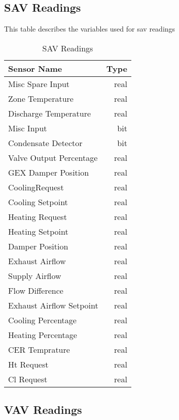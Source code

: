 \pagebreak

\subsection{SAV Readings}

This table describes the variables used for \gls{sav} readings

\begin{table}[!htb]
\centering
\begin{tabular}{| l r |}
	\hline
	\textbf{Sensor Name}           & \textbf{Type} \\ 
  	\hline
  	Misc Spare Input         & real \\
Zone Temperature         & real \\
Discharge Temperature    & real \\
Misc Input               & bit  \\
Condensate Detector      & bit  \\
Valve Output Percentage  & real \\
GEX Damper Position      & real \\
CoolingRequest           & real \\
Cooling Setpoint         & real \\
Heating Request          & real \\
Heating Setpoint         & real \\
Damper Position          & real \\
Exhaust Airflow          & real \\
Supply Airflow           & real \\
Flow Difference          & real \\
Exhaust Airflow Setpoint & real \\
Cooling Percentage       & real \\
Heating Percentage       & real \\
CER Temprature           & real \\
Ht Request               & real \\
Cl Request               & real \\
  	\hline
\end{tabular}
\caption{SAV Readings}
\label{table:sav_readings}
\end{table}


\subsection{VAV Readings}

